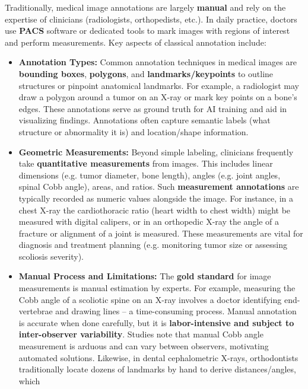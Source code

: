 \documentclass[
]{article}
\begin{document}
Traditionally, medical image annotations are largely \textbf{manual} and
rely on the expertise of clinicians (radiologists, orthopedists, etc.).
In daily practice, doctors use \textbf{PACS} software or dedicated tools
to mark images with regions of interest and perform measurements. Key
aspects of classical annotation include:

\begin{itemize}
\item
  \textbf{Annotation Types:} Common annotation techniques in medical
  images are \textbf{bounding boxes}, \textbf{polygons}, and
  \textbf{landmarks/keypoints} to outline structures or pinpoint
  anatomical
  landmarks\cite{key-22}.
  For example, a radiologist may draw a polygon around a tumor on an
  X-ray or mark key points on a bone's edges. These annotations serve as
  ground truth for AI training and aid in visualizing findings.
  Annotations often capture semantic labels (what structure or
  abnormality it is) and location/shape information.
\item
  \textbf{Geometric Measurements:} Beyond simple labeling, clinicians
  frequently take \textbf{quantitative measurements} from images. This
  includes linear dimensions (e.g. tumor diameter, bone length), angles
  (e.g. joint angles, spinal Cobb angle), areas, and ratios. Such
  \textbf{measurement annotations} are typically recorded as numeric
  values alongside the
  image\cite{key-23}.
  For instance, in a chest X-ray the cardiothoracic ratio (heart width
  to chest width) might be measured with digital calipers, or in an
  orthopedic X-ray the angle of a fracture or alignment of a joint is
  measured. These measurements are vital for diagnosis and treatment
  planning (e.g. monitoring tumor size or assessing scoliosis severity).
\item
  \textbf{Manual Process and Limitations:} The \textbf{gold standard}
  for image measurements is manual estimation by experts. For example,
  measuring the Cobb angle of a scoliotic spine on an X-ray involves a
  doctor identifying end-vertebrae and drawing lines -- a time-consuming
  process\cite{key-24}.
  Manual annotation is accurate when done carefully, but it is
  \textbf{labor-intensive and subject to inter-observer variability}.
  Studies note that manual Cobb angle measurement is arduous and can
  vary between observers, motivating automated
  solutions\cite{key-24}\cite{key-25}.
  Likewise, in dental cephalometric X-rays, orthodontists traditionally
  locate dozens of landmarks by hand to derive distances/angles, which

\end{itemize}
\end{document}
